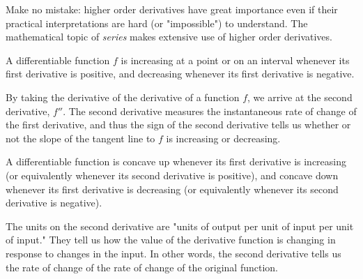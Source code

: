 Make no mistake: higher order derivatives have great importance even if their practical interpretations are hard (or "impossible") to understand. The mathematical topic of \textit{series} makes extensive use of higher order derivatives.

\begin{summary}
\item A differentiable function $f$ is increasing at a point or on an interval whenever its first derivative is positive, and decreasing whenever its first derivative is negative.
\item By taking the derivative of the derivative of a function $f$, we arrive at the second derivative, $f''$.  The second derivative measures the instantaneous rate of change of the first derivative, and thus the sign of the second derivative tells us whether or not the slope of the tangent line to $f$ is increasing or decreasing.
\item A differentiable function is concave up whenever its first derivative is increasing (or equivalently whenever its second derivative is positive), and concave down whenever its first derivative is decreasing (or equivalently whenever its second derivative is negative).  %
\item The units on the second derivative are "units of output per unit of input per unit of input."  They tell us how the value of the derivative function is changing in response to changes in the input.  In other words, the second derivative tells us the rate of change of the rate of change of the original function.
\end{summary}

 

\cleardoublepage